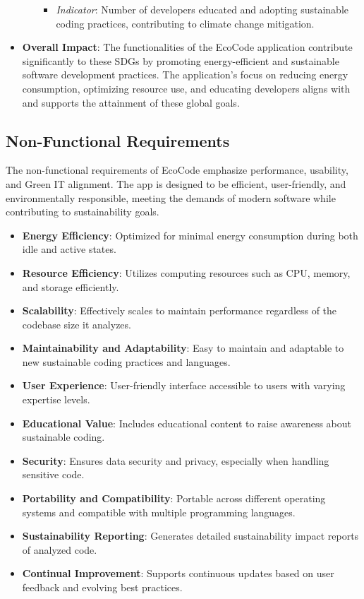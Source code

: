 \documentclass[conference,compsoc]{IEEEtran}
\begin{document}
\begin{itemize}
\begin{itemize}
\begin{itemize}
                \item \textit{Indicator}: Number of developers educated and adopting sustainable coding practices, contributing to climate change mitigation.
            \end{itemize}
    \end{itemize}
    \item \textbf{Overall Impact}: The functionalities of the EcoCode application contribute significantly to these SDGs by promoting energy-efficient and sustainable software development practices. The application's focus on reducing energy consumption, optimizing resource use, and educating developers aligns with and supports the attainment of these global goals.
\end{itemize}


\subsection{Non-Functional Requirements}
The non-functional requirements of EcoCode emphasize performance, usability, and Green IT alignment. The app is designed to be efficient, user-friendly, and environmentally responsible, meeting the demands of modern software while contributing to sustainability goals.

\begin{itemize}
    \item \textbf{Energy Efficiency}: Optimized for minimal energy consumption during both idle and active states.
    \item \textbf{Resource Efficiency}: Utilizes computing resources such as CPU, memory, and storage efficiently.
    \item \textbf{Scalability}: Effectively scales to maintain performance regardless of the codebase size it analyzes.
    \item \textbf{Maintainability and Adaptability}: Easy to maintain and adaptable to new sustainable coding practices and languages.
    \item \textbf{User Experience}: User-friendly interface accessible to users with varying expertise levels.
    \item \textbf{Educational Value}: Includes educational content to raise awareness about sustainable coding.
    \item \textbf{Security}: Ensures data security and privacy, especially when handling sensitive code.
    \item \textbf{Portability and Compatibility}: Portable across different operating systems and compatible with multiple programming languages.
    \item \textbf{Sustainability Reporting}: Generates detailed sustainability impact reports of analyzed code.
    \item \textbf{Continual Improvement}: Supports continuous updates based on user feedback and evolving best practices.
\end{itemize}
\end{document}
